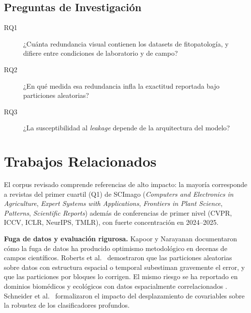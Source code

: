 \documentclass[journal,compsoc]{IEEEtran}
\begin{document}
\subsection*{Preguntas de Investigación}
\begin{description}
\item[RQ1] ¿Cuánta redundancia visual contienen los datasets de fitopatología, y difiere entre condiciones de laboratorio y de campo?
\item[RQ2] ¿En qué medida esa redundancia infla la exactitud reportada bajo particiones aleatorias?
\item[RQ3] ¿La susceptibilidad al \textit{leakage} depende de la arquitectura del modelo?
\end{description}

\section{Trabajos Relacionados}
El corpus revisado comprende referencias de alto impacto: la mayoría corresponde a revistas del primer cuartil (Q1) de SCImago (\textit{Computers and Electronics in Agriculture}, \textit{Expert Systems with Applications}, \textit{Frontiers in Plant Science}, \textit{Patterns}, \textit{Scientific Reports}) además de conferencias de primer nivel (CVPR, ICCV, ICLR, NeurIPS, TMLR), con fuerte concentración en 2024--2025.

\textbf{Fuga de datos y evaluación rigurosa.} Kapoor y Narayanan \cite{kapoor2023leakage} documentaron cómo la fuga de datos ha producido optimismo metodológico en decenas de campos científicos. Roberts et al.\ \cite{roberts2017crossval} demostraron que las particiones aleatorias sobre datos con estructura espacial o temporal subestiman gravemente el error, y que las particiones por bloques lo corrigen. El mismo riesgo se ha reportado en dominios biomédicos y ecológicos con datos espacialmente correlacionados \cite{roberts2017crossval}. Schneider et al.\ \cite{schneider2020domain} formalizaron el impacto del desplazamiento de covariables sobre la robustez de los clasificadores profundos.
\end{document}
